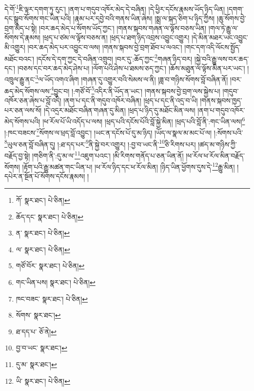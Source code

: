 དེ་གོ་\footnote{ཀོ་  སྣར་ཐང་།  པེ་ཅིན། }ཇི་ལྟར་དགག་ཏུ་རུང་། །ནག་པ་གདུབ་འཁོར་མེད་དེ་བཞིན། །དེ་ཕྱིར་དངོས་རྣམས་ཡོད་ཉིད་ཡིན། །དགག་དང་སྒྲུབ་སོགས་གང་ཡིན་པའི། །རྣམ་པར་དབྱེ་བའི་གནས་ཡིན་ཞེས། །སྨྲ་ལ་སྐད་ཅིག་པ་ཉིད་ཀྱིས། །ཆུ་སོགས་བྱེ་བྲག་མེད་པ་སྟེ། །བར་ཆད་མེད་པ་སོགས་ཡོད་ཀྱང་། །གནས་སྐབས་གཞན་ལ་ལྟོས་བཅས་ཡིན། །གལ་ཏེ་རྒྱུ་ལ་སོགས་དེ་རྣམས། །ཕྲད་པ་ཙམ་ལ་ལྟོས་བཅས་ན། །ཕྲད་པ་ཐག་ཉིད་འབྲས་འབྱུང་འགྱུར། །དེ་མིན་མཐར་ཡང་འབྱུང་མི་འགྱུར། །བར་ཆད་མེད་པར་འབྱུང་བ་ལས། །གནས་སྐབས་བྱེ་བྲག་ཐོབ་པ་ལའང་། །གང་དག་འདི་ལོངས་སྤྱོད་མཐོང་བའང་། །དངོས་དེ་དག་ཀྱང་དེ་བཞིན་འགྲུབ། །བར་དུ་:ཆོད་ཀྱང་\footnote{ཆོད་དང་  སྣར་ཐང་།  པེ་ཅིན། }གཞན་ཉིད་བར། །སྐྱེ་བའི་རྒྱུ་ལས་བར་ཆད་དང་། །བཅས་དང་བར་ཆད་མེད་ཤེས་པ། །ལོག་པའི་ཤེས་པ་ཐམས་ཅད་ཀྱང་། །ཆོས་མཐུན་ལ་ལྟོས་མིན་པར་ཡང་། །འཁྲུལ་རྒྱུ་ནང་\footnote{ན་  སྣར་ཐང་།  པེ་ཅིན། }ལ་ཡོད་འགའ་ཞིག །གཞན་དུ་འགྱུར་བའི་སེམས་ལ་ནི། །ཟླ་བ་གཉིས་སོགས་བློ་བཞིན་ནོ། །བར་ཆད་མེད་སོགས་ལས་\footnote{ལ་  སྣར་ཐང་།  པེ་ཅིན། }བྱུང་བ། །:གཙོ་བོ་\footnote{གཙོ་བོར་  སྣར་ཐང་།  པེ་ཅིན། }འདིར་ནི་ཡོད་ན་ཡང་། །གནས་སྐབས་བྱེ་བྲག་ལས་སྐྱེས་པ། །གདུབ་འཁོར་ཅན་ཞེས་པ་བློ་འདི། །ནག་པ་དང་ནི་གདུབ་འཁོར་བཞིན། །ཕྲད་པ་དང་ནི་འདྲ་བ་ཡི། །གནས་སྐབས་ཁྱད་པར་ཅན་ལས་སོ། །དེ་འདྲར་མཐོང་བཞིན་གཞན་དུ་མིན། །ཕྲད་པ་ཉིད་དུ་མཐོང་མིན་ལས། །ནག་པ་གདུབ་འཁོར་མེད་སོགས་པའི། །ཕ་རོལ་པོ་ཡི་འདོད་པ་ལས། །ཕྲད་པའི་དངོས་པོའི་བློ་སྐྱེ་མིན། །ཕྲད་པའི་བློ་ནི་:གང་ཡིན་ལས།\footnote{གང་ཡིན་པས།  སྣར་ཐང་།  པེ་ཅིན། } །:ཁང་བཟངས་\footnote{ཁང་བཟང་  སྣར་ཐང་།  པེ་ཅིན། }སོགས་ལ་ཕྲད་བློ་འབྱུང་། །ཡང་ན་དངོས་པོ་དུ་མ་ཉིད། །ཡོད་ལ་སྣལ་མ་མང་པོ་ལ། །:སོགས་པའི་\footnote{སོགས་  སྣར་ཐང་། }ཡུལ་ཅན་བློ་བཞིན་དུ། །:ཐ་དད་པར་\footnote{ཐ་དད་པ་  ཅོ་ནེ། }ནི་སྐྱེ་བར་འགྱུར། །:བྱ་བ་ཡང་ནི་\footnote{བྱ་བ་ཡང་  སྣར་ཐང་། }ཅི་རིགས་པར། །ཚད་མ་གཉིས་ཀྱི་བརྗོད་བྱ་སྟེ། །གཅིག་ནི་:དུ་མ་ལ་\footnote{དུ་མ་  སྣར་ཐང་། }འཇུག་པའང་། །མི་རིགས་གནོད་པ་ཅན་ཡིན་ནོ། །ཕ་རོལ་ཕ་རོལ་མིན་བརྗོད་སོགས། །རྟོག་པའི་རྒྱུ་མཚན་གང་ཡིན་པ། །ཕ་རོལ་ཉིད་དང་ཕ་རོལ་མིན། །ཉིད་ཡིན་ཕྱོགས་དུས་དེ་\footnote{ཡི་  སྣར་ཐང་།  པེ་ཅིན། }རྒྱུ་མིན། །དཔེར་ན་སྔོན་པོ་སོགས་དངོས་རྣམས། །
